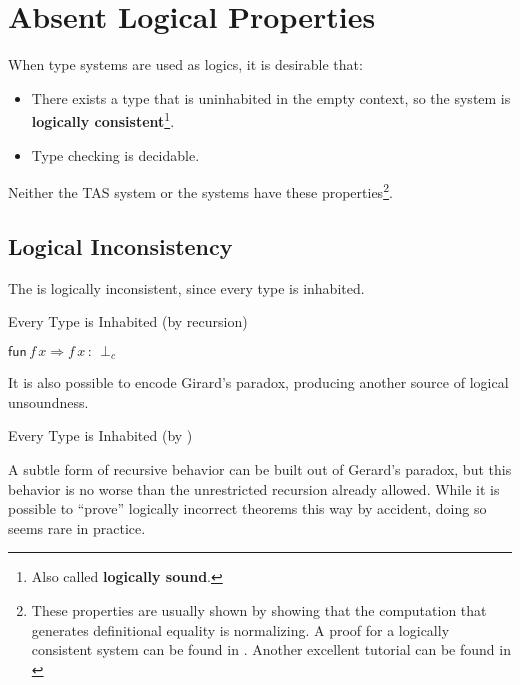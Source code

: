 \section{Absent Logical Properties}
 
When type systems are used as logics, it is desirable that:
\begin{itemize}
\item There exists a type that is uninhabited in the empty context, so the system is \textbf{logically consistent}\footnote{
  Also called \textbf{logically sound}.}.
\item Type checking is decidable.
\end{itemize}
Neither the \ac{TAS} system or the \bidir{} systems have these properties\footnote{
 These properties are usually shown by showing that the computation that generates definitional equality is normalizing.
 A proof for a logically consistent system can be found in \cite[Chapter 4]{luo1994computation}.
 Another excellent tutorial can be found in \cite[Chapter 2]{casinghino2014combiningthesis}}.
 
\subsection{Logical Inconsistency}
 
The \slang{} is logically inconsistent, since every type is inhabited.
 
\begin{example}
Every Type is Inhabited (by recursion)
 
$\mathsf{fun}\,f\,x\Rightarrow f\,x\,:\,\perp_{c}$
\end{example}
 
It is also possible to encode Girard's paradox, producing another source of logical unsoundness.
\begin{example}
Every Type is Inhabited (by \tit{})
 
 
\end{example}
 
A subtle form of recursive behavior can be built out of Gerard's paradox\cite{Reinhold89typecheckingis}, but this behavior is no worse than the unrestricted recursion already allowed.
While it is possible to ``prove'' logically incorrect theorems this way by accident, doing so seems rare in practice.
 
